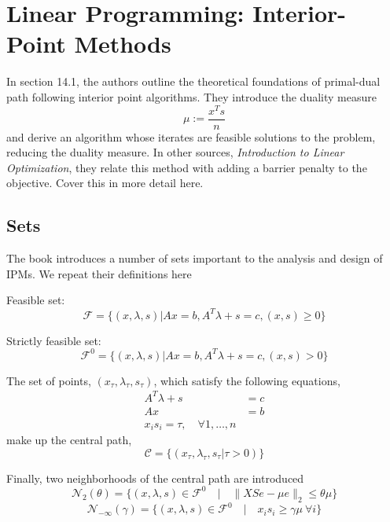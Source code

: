 \newpage
\section{Linear Programming: Interior-Point Methods}

In section 14.1, the authors outline the theoretical foundations of primal-dual path following interior point algorithms.
They introduce the duality measure
\[
    \mu := \frac{x^Ts}{n}
\]
and derive an algorithm whose iterates are feasible solutions to the problem, reducing the duality measure.
In other sources, \textit{Introduction to Linear Optimization}, they relate this method with adding a barrier penalty to the objective.
Cover this in more detail here.

\subsection{Sets}
The book introduces a number of sets important to the analysis and design of IPMs.
We repeat their definitions here

Feasible set:
\begin{equation}
    \mathcal{F} = \{ (x, \lambda, s) | Ax = b, A^T \lambda + s = c, (x, s) \geq 0 \}
\end{equation}

Strictly feasible set:
\begin{equation}
    \mathcal{F}^\mathit{0} = \{ (x, \lambda, s) | Ax = b, A^T \lambda + s = c, (x, s) > 0 \}
\end{equation}

The set of points, $(x_\tau, \lambda_\tau, s_\tau)$, which satisfy the following equations,
\begin{align*}
    A^T\lambda + s & = c \\
    Ax             & = b \\
    x_i s_i = \tau, \quad \forall 1, \dots, n
\end{align*}
make up the central path,
\begin{equation}
    \mathcal{C} = \{ (x_\tau, \lambda_\tau, s_\tau | \tau > 0) \}
\end{equation}

Finally, two neighborhoods of the central path are introduced
\begin{equation}
    \mathcal{N}_2(\theta) =  \{ (x, \lambda, s) \in \mathcal{F}^\mathit{0} \quad | \quad \| XSe - \mu e \|_2 \leq \theta \mu \}
    \label{eq:ipm_set_n2}
\end{equation}
\begin{equation}
    \mathcal{N}_{-\infty}(\gamma) =  \{ (x, \lambda, s) \in \mathcal{F}^\mathit{0} \quad | \quad x_i s_i \geq \gamma \mu \> \forall i \}
\end{equation}

